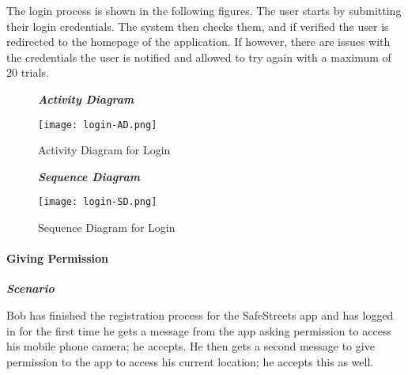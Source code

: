 The login process is shown in the following figures. The user starts by submitting their login credentials. The system then checks them, and if verified the user is redirected to the homepage of the application. If however, there are issues with the credentials the user is notified and allowed to try again with a maximum of 20 trials.

\begin{figure}[H]
\begin{flushleft}\emph{\textbf{Activity Diagram}}\end{flushleft}
\caption{Activity Diagram for Login}
\label{fig:AD-login}
\centering
\texttt{[image: login-AD.png]}
\end{figure}

\begin{figure}[H]
\begin{flushleft}\emph{\textbf{Sequence Diagram}}\end{flushleft}
\caption{Sequence Diagram for Login}
\label{fig:SD-login}
\centering
\texttt{[image: login-SD.png]}
\end{figure}

\paragraph{Giving Permission}
\hfill \break

\begin{flushleft}\emph{\textbf{Scenario}}\end{flushleft}

Bob has finished the registration process for the SafeStreets app and has logged in for the first time he gets a message from the app asking permission to access his mobile phone camera; he accepts. He then gets a second message to give permission to the app to access his current location; he accepts this as well.


